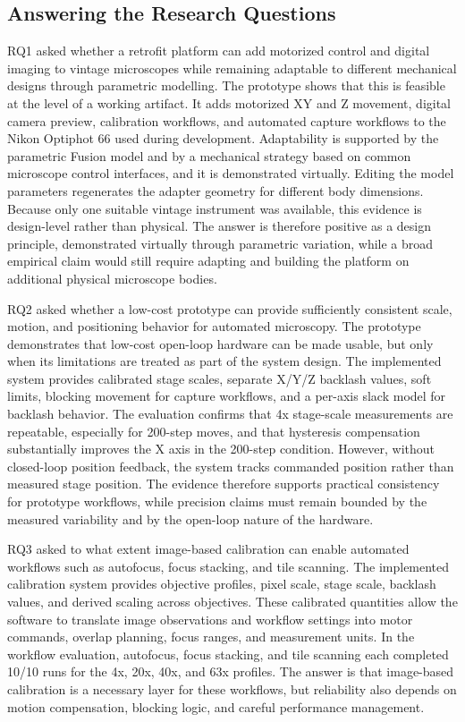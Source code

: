 \subsection{Answering the Research Questions}

RQ1 asked whether a retrofit platform can add motorized control and digital imaging to vintage microscopes while remaining adaptable to different mechanical designs through parametric modelling. The prototype shows that this is feasible at the level of a working artifact. It adds motorized XY and Z movement, digital camera preview, calibration workflows, and automated capture workflows to the Nikon Optiphot 66 used during development. Adaptability is supported by the parametric Fusion model and by a mechanical strategy based on common microscope control interfaces, and it is demonstrated virtually. Editing the model parameters regenerates the adapter geometry for different body dimensions. Because only one suitable vintage instrument was available, this evidence is design-level rather than physical. The answer is therefore positive as a design principle, demonstrated virtually through parametric variation, while a broad empirical claim would still require adapting and building the platform on additional physical microscope bodies.

RQ2 asked whether a low-cost prototype can provide sufficiently consistent scale, motion, and positioning behavior for automated microscopy. The prototype demonstrates that low-cost open-loop hardware can be made usable, but only when its limitations are treated as part of the system design. The implemented system provides calibrated stage scales, separate X/Y/Z backlash values, soft limits, blocking movement for capture workflows, and a per-axis slack model for backlash behavior. The evaluation confirms that 4x stage-scale measurements are repeatable, especially for 200-step moves, and that hysteresis compensation substantially improves the X axis in the 200-step condition. However, without closed-loop position feedback, the system tracks commanded position rather than measured stage position. The evidence therefore supports practical consistency for prototype workflows, while precision claims must remain bounded by the measured variability and by the open-loop nature of the hardware.

RQ3 asked to what extent image-based calibration can enable automated workflows such as autofocus, focus stacking, and tile scanning. The implemented calibration system provides objective profiles, pixel scale, stage scale, backlash values, and derived scaling across objectives. These calibrated quantities allow the software to translate image observations and workflow settings into motor commands, overlap planning, focus ranges, and measurement units. In the workflow evaluation, autofocus, focus stacking, and tile scanning each completed 10/10 runs for the 4x, 20x, 40x, and 63x profiles. The answer is that image-based calibration is a necessary layer for these workflows, but reliability also depends on motion compensation, blocking logic, and careful performance management.

